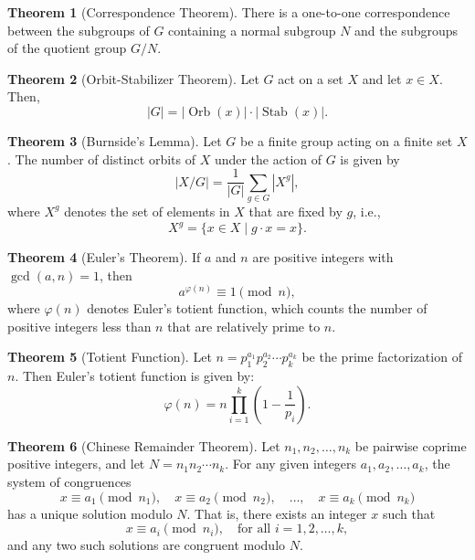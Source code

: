 \documentclass[12pt]{article}
\theoremstyle{definition} %
\newtheorem{theorem}{Theorem}
\theoremstyle{plain} %
\begin{document}
\begin{theorem}[Correspondence Theorem]
There is a one-to-one correspondence between the subgroups of \(G\) containing a normal subgroup \(N\) and the subgroups of the quotient group \(G/N\).
\end{theorem}

\begin{theorem}[Orbit-Stabilizer Theorem]
Let \(G\) act on a set \(X\) and let \(x \in X\). Then,
\[
|G| = |\operatorname{Orb}(x)| \cdot |\operatorname{Stab}(x)|.
\]
\end{theorem}

\begin{theorem}[Burnside's Lemma]
  Let \( G \) be a finite group acting on a finite set \( X \). The number of distinct orbits of \( X \) under the action of \( G \) is given by
  \[
  |X/G| = \frac{1}{|G|} \sum_{g \in G} |X^g|,
  \]
  where \( X^g \) denotes the set of elements in \( X \) that are fixed by \( g \), i.e., 
  \[
  X^g = \{ x \in X \mid g \cdot x = x \}.
  \]
\end{theorem}

\begin{theorem}[Euler's Theorem]
  If \(a\) and \(n\) are positive integers with \(\gcd(a,n) = 1\), then
\[
a^{\varphi(n)} \equiv 1 \pmod{n},
\]
where \(\varphi(n)\) denotes Euler's totient function, which counts the number of positive integers less than \(n\) that are relatively prime to \(n\).
\end{theorem}

\begin{theorem}[Totient Function]
  Let \( n = p_1^{a_1} p_2^{a_2} \cdots p_k^{a_k} \) be the prime factorization of \( n \). Then Euler's totient function is given by:
  \[
  \varphi(n) = n \prod_{i=1}^{k} \left(1 - \frac{1}{p_i}\right).
  \] 
\end{theorem}

\begin{theorem}[Chinese Remainder Theorem]
  Let \( n_1, n_2, \dots, n_k \) be pairwise coprime positive integers, and let \( N = n_1 n_2 \cdots n_k \). For any given integers \( a_1, a_2, \dots, a_k \), the system of congruences
  \[
  x \equiv a_1 \pmod{n_1}, \quad x \equiv a_2 \pmod{n_2}, \quad \dots, \quad x \equiv a_k \pmod{n_k}
  \]
  has a unique solution modulo \( N \). That is, there exists an integer \( x \) such that
  \[
  x \equiv a_i \pmod{n_i}, \quad \text{for all } i = 1, 2, \dots, k,
  \]
  and any two such solutions are congruent modulo \( N \).
\end{theorem}
\end{document}
